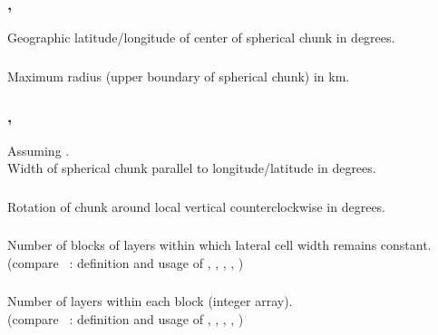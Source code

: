 \subsubsection{,} %
Geographic latitude/longitude of center of spherical chunk in degrees.
\subsubsection{}
Maximum radius (upper boundary of spherical chunk) in km.
\subsubsection{, }
Assuming .\\
Width of spherical chunk parallel to longitude/latitude in degrees.
\subsubsection{}
Rotation of chunk around local vertical counterclockwise in degrees.
\subsubsection{}
Number of blocks of layers within which lateral cell width remains constant.\\
(compare ~: definition and usage of , 
, , , )
\subsubsection{}
Number of layers within each block (integer array).\\
(compare ~: definition and usage of , 
, , , )
